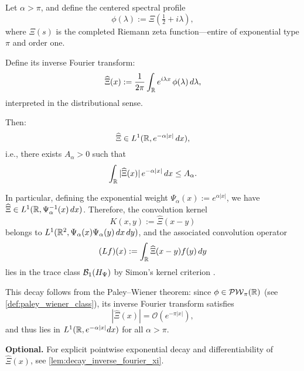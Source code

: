 \begin{lemma}
\label{lem:weighted_L1_inverse_FT_xi}
Let \( \alpha > \pi \), and define the centered spectral profile
\[
\phi(\lambda) := \Xi\left( \tfrac{1}{2} + i\lambda \right),
\]
where \( \Xi(s) \) is the completed Riemann zeta function—entire of exponential type \( \pi \) and order one.

Define its inverse Fourier transform:
\[
\widehat{\Xi}(x) := \frac{1}{2\pi} \int_{\mathbb{R}} e^{i\lambda x} \, \phi(\lambda)\, d\lambda,
\]
interpreted in the distributional sense.

Then:
\[
\widehat{\Xi} \in L^1(\mathbb{R}, e^{-\alpha |x|}\, dx),
\]
i.e., there exists \( A_\alpha > 0 \) such that
\[
\int_{\mathbb{R}} |\widehat{\Xi}(x)| \, e^{-\alpha |x|}\, dx \le A_\alpha.
\]

\medskip
\noindent
In particular, defining the exponential weight \( \Psi_\alpha(x) := e^{\alpha |x|} \), we have \( \widehat{\Xi} \in L^1(\mathbb{R}, \Psi_\alpha^{-1}(x)\, dx) \). Therefore, the convolution kernel
\[
K(x,y) := \widehat{\Xi}(x - y)
\]
belongs to \( L^1(\mathbb{R}^2, \Psi_\alpha(x)\Psi_\alpha(y)\, dx\,dy) \), and the associated convolution operator
\[
(L f)(x) := \int_{\mathbb{R}} \widehat{\Xi}(x - y) f(y)\, dy
\]
lies in the trace class \( \mathcal{B}_1(H_{\Psi}) \) by Simon’s kernel criterion \cite[Thm.~4.2]{Simon2005TraceIdeals}.

\medskip
\noindent
This decay follows from the Paley--Wiener theorem: since \( \phi \in \mathcal{PW}_{\pi}(\mathbb{R}) \) (see \cref{def:paley_wiener_class}), its inverse Fourier transform satisfies
\[
|\widehat{\Xi}(x)| = \mathcal{O}(e^{-\pi |x|}),
\]
and thus lies in \( L^1(\mathbb{R}, e^{-\alpha |x|} dx) \) for all \( \alpha > \pi \).

\medskip
\noindent
\textbf{Optional.} For explicit pointwise exponential decay and differentiability of \( \widehat{\Xi}(x) \), see \cref{lem:decay_inverse_fourier_xi}.
\end{lemma}
